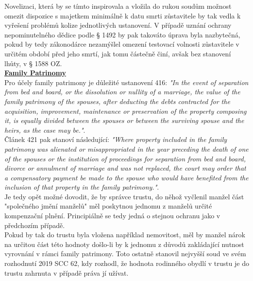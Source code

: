 \documentclass{article}
\begin{document}
Novelizaci, která by se tímto inspirovala a vložila do rukou soudům možnost omezit dispozice s majetkem minimálně k datu smrti zůstavitele by tak vedla k vyřešení problémů kolize jednotlivých ustanovení. V případě uznání ochrany nepominutelného dědice podle § 1492 by pak takováto úprava byla nazbytečná, pokud by tedy zákonodárce nezamýšlel omezení testovací volnosti zůstavitele v určitém období před jeho smrtí, jak tomu částečně činí, avšak bez stanovení lhůty, v § 1588 OZ.\\

\underline{\textbf{Family Patrinomy}}\\

Pro účely family patrimony je důležité ustanovení 416: \textit{"In the event of separation from bed and board, or the dissolution or nullity of a marriage, the value of the family patrimony of the spouses, after deducting the debts contracted for the acquisition, improvement, maintenance or preservation of the property composing it, is equally divided between the spouses or between the surviving spouse and the heirs, as the case may be."}.\\

Článek 421 pak stanoví následující: \textit{"Where property included in the family patrimony was alienated or misappropriated in the year preceding the death of one of the spouses or the institution of proceedings for separation from bed and board, divorce or annulment of marriage and was not replaced, the court may order that a compensatory payment be made to the spouse who would have benefited from the inclusion of that property in the family patrimony."}.\\

Je tedy opět možné dovodit, že by správce trustu, do něhož vyčlenil manžel část "společného jmění manželů" měl poskytnou jednomu z manželů určité kompenzační plnění. Principiálně se tedy jedná o stejnou ochranu jako v předchozím případě.\\

Pokud by tak do trustu byla vložena například nemovitost, měl by manžel nárok na určitou část této hodnoty došlo-li by k jednomu z důvodů zakládající nutnost vyrovnání v rámci family patrimony. Toto ostatně stanovil nejvyšší soud ve svém rozhodnutí 2019 SCC 62, kdy rozhodl, že hodnota rodinného obydlí v trustu je do trustu zahrnuta v případě práva jí užívat.\\
\end{document}
